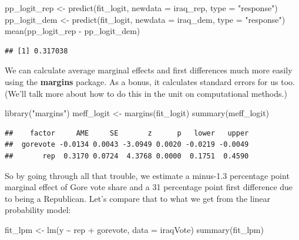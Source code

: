 \documentclass[
  12pt,
  oneside,openany]{book}
\newenvironment{Shaded}{\begin{snugshade}}{\end{snugshade}}
\newcommand{\AttributeTok}[1]{\textcolor[rgb]{0.77,0.63,0.00}{#1}}
\newcommand{\FunctionTok}[1]{\textcolor[rgb]{0.00,0.00,0.00}{#1}}
\newcommand{\NormalTok}[1]{#1}
\newcommand{\OtherTok}[1]{\textcolor[rgb]{0.56,0.35,0.01}{#1}}
\newcommand{\SpecialCharTok}[1]{\textcolor[rgb]{0.00,0.00,0.00}{#1}}
\newcommand{\StringTok}[1]{\textcolor[rgb]{0.31,0.60,0.02}{#1}}
\begin{document}
\begin{Shaded}
\begin{Highlighting}[]
\NormalTok{pp\_logit\_rep }\OtherTok{\textless{}{-}} \FunctionTok{predict}\NormalTok{(fit\_logit, }\AttributeTok{newdata =}\NormalTok{ iraq\_rep, }\AttributeTok{type =} \StringTok{"response"}\NormalTok{)}
\NormalTok{pp\_logit\_dem }\OtherTok{\textless{}{-}} \FunctionTok{predict}\NormalTok{(fit\_logit, }\AttributeTok{newdata =}\NormalTok{ iraq\_dem, }\AttributeTok{type =} \StringTok{"response"}\NormalTok{)}
\FunctionTok{mean}\NormalTok{(pp\_logit\_rep }\SpecialCharTok{{-}}\NormalTok{ pp\_logit\_dem)}
\end{Highlighting}
\end{Shaded}

\begin{verbatim}
## [1] 0.317038
\end{verbatim}

We can calculate average marginal effects and first differences much more easily using the \textbf{margins} package.
As a bonus, it calculates standard errors for us too.
(We'll talk more about how to do this in the unit on computational methods.)

\begin{Shaded}
\begin{Highlighting}[]
\FunctionTok{library}\NormalTok{(}\StringTok{"margins"}\NormalTok{)}
\NormalTok{meff\_logit }\OtherTok{\textless{}{-}} \FunctionTok{margins}\NormalTok{(fit\_logit)}
\FunctionTok{summary}\NormalTok{(meff\_logit)}
\end{Highlighting}
\end{Shaded}

\begin{verbatim}
##    factor     AME     SE       z      p   lower   upper
##  gorevote -0.0134 0.0043 -3.0949 0.0020 -0.0219 -0.0049
##       rep  0.3170 0.0724  4.3768 0.0000  0.1751  0.4590
\end{verbatim}

So by going through all that trouble, we estimate a minus-1.3 percentage point marginal effect of Gore vote share and a 31 percentage point first difference due to being a Republican.
Let's compare that to what we get from the linear probability model:

\begin{Shaded}
\begin{Highlighting}[]
\NormalTok{fit\_lpm }\OtherTok{\textless{}{-}} \FunctionTok{lm}\NormalTok{(y }\SpecialCharTok{\textasciitilde{}}\NormalTok{ rep }\SpecialCharTok{+}\NormalTok{ gorevote, }\AttributeTok{data =}\NormalTok{ iraqVote)}
\FunctionTok{summary}\NormalTok{(fit\_lpm)}
\end{Highlighting}
\end{Shaded}
\end{document}
